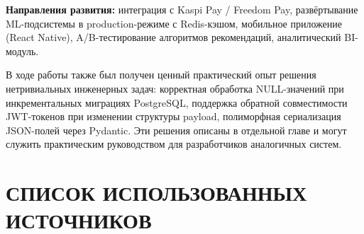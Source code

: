 \documentclass[14pt,a4paper]{extreport}
\begin{document}
\textbf{Направления развития:} интеграция с Kaspi Pay / Freedom Pay, развёртывание ML-подсистемы в production-режиме с Redis-кэшом, мобильное приложение (React Native), A/B-тестирование алгоритмов рекомендаций, аналитический BI-модуль.

В ходе работы также был получен ценный практический опыт решения нетривиальных инженерных задач: корректная обработка NULL-значений при инкрементальных миграциях PostgreSQL, поддержка обратной совместимости JWT-токенов при изменении структуры payload, полиморфная сериализация JSON-полей через Pydantic. Эти решения описаны в отдельной главе и могут служить практическим руководством для разработчиков аналогичных систем.

\chapter*{СПИСОК ИСПОЛЬЗОВАННЫХ ИСТОЧНИКОВ}
\end{document}

